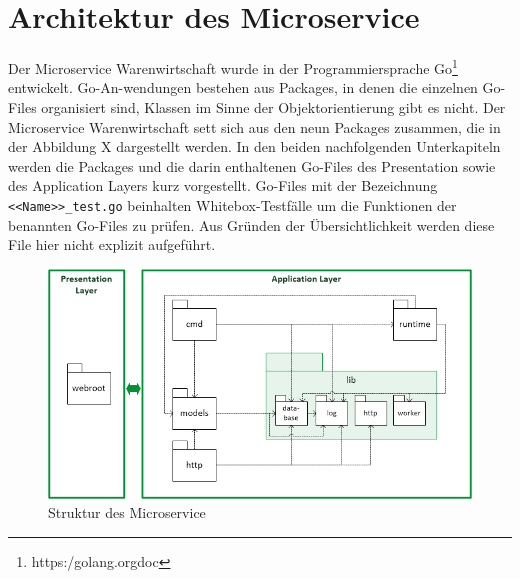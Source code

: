 \section{Architektur des Microservice}
\label{sec: Architektur des Microservice}
Der Microservice Warenwirtschaft wurde in der Programmiersprache Go\footnote{https:\//golang.org\/doc\/} entwickelt. Go-An-wendungen bestehen aus Packages, in denen die einzelnen Go-Files organisiert sind, Klassen im Sinne der Objektorientierung gibt es nicht. Der Microservice Warenwirtschaft sett sich aus den neun Packages zusammen, die in der Abbildung X dargestellt werden. In den beiden nachfolgenden Unterkapiteln werden die Packages und die darin enthaltenen Go-Files des Presentation  sowie des Application Layers kurz vorgestellt. Go-Files mit der Bezeichnung \texttt{<<Name>>\_test.go} beinhalten Whitebox-Testfälle um die Funktionen der benannten Go-Files zu prüfen. Aus Gründen der Übersichtlichkeit werden diese File hier nicht explizit aufgeführt. 

\begin{figure}[H]
	\centering
	\includegraphics[width=0.95 \textwidth]{./pics/struktur.png}
	\caption{Struktur des Microservice}
	\label{pic:Struktur des Microservice}
\end{figure}

\newpage

